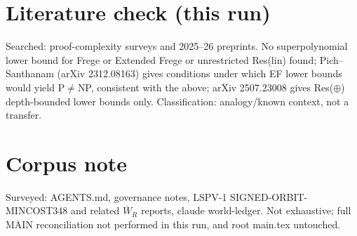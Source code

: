 \documentclass{article}
\begin{document}
\section*{Literature check (this run)}
Searched: proof-complexity surveys and 2025--26 preprints. No superpolynomial lower bound for Frege or Extended Frege or unrestricted Res(lin) found; Pich--Santhanam (arXiv 2312.08163) gives conditions under which EF lower bounds would yield P$\neq$NP, consistent with the above; arXiv 2507.23008 gives Res($\oplus$) depth-bounded lower bounds only. Classification: analogy/known context, not a transfer.

\section*{Corpus note}
Surveyed: AGENTS.md, governance notes, LSPV-1 SIGNED-ORBIT-MINCOST348 and related $\overline W_R$ reports, claude world-ledger. Not exhaustive; full MAIN reconciliation not performed in this run, and root main.tex untouched.
\end{document}
